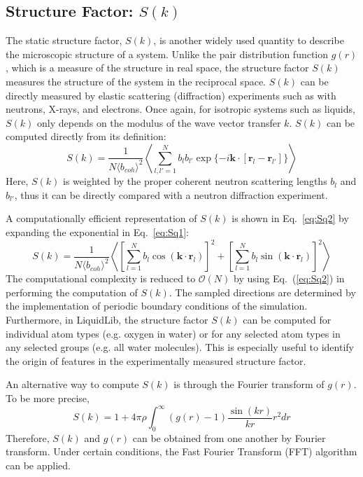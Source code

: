 \documentclass{article}
\begin{document}
\subsection{Structure Factor: $S(k)$} \label{sec::sofk}
The static structure factor, $S(k)$, is another widely used quantity to describe the microscopic structure of a system. Unlike the pair distribution function $g(r)$, which is a measure of the structure in real space, the structure factor $S(k)$ measures the structure of the system in the reciprocal space. $S(k)$ can be directly measured by elastic scattering (diffraction) experiments such as with neutrons, X-rays, and electrons. Once again, for isotropic systems such as liquids, $S(k)$ only depends on the modulus of the wave vector transfer $k$. $S(k)$ can be computed directly from its definition: 
\begin{equation}
	\label{eq:Sq1}
	S(k) = \frac{1}{N\langle b_{coh}\rangle^2}\left\langle\sum_{l,l'=1}^{N} b_lb_{l'}\exp{\{-i\mathbf{k}\cdot[\mathbf{r}_l - \mathbf{r}_{l'}]\}}\right\rangle
\end{equation}
Here, $S(k)$ is weighted by the proper coherent neutron scattering lengths $b_l$ and $b_{l'}$, thus it can be directly compared with a neutron diffraction experiment.

A computationally efficient representation of $S(k)$ is shown in Eq.~\ref{eq:Sq2} by expanding the exponential in Eq.~\ref{eq:Sq1}:
\begin{equation}
	\label{eq:Sq2}
	S(k) = \frac{1}{N\langle b_{coh}\rangle^2}\left\langle\left[\sum_{l=1}^{N} b_l\cos(\mathbf{k}\cdot\mathbf{r}_l)\right]^2+\left[\sum_{l=1}^{N} b_l\sin(\mathbf{k}\cdot\mathbf{r}_l)\right]^2\right\rangle
\end{equation} 
The computational complexity is reduced to $\mathcal{O}(N)$ by using Eq.~(\ref{eq:Sq2}) in performing the computation of $S(k)$. The sampled directions are determined by the implementation of periodic boundary conditions of the simulation. Furthermore, in LiquidLib, the structure factor $S(k)$ can be computed for individual atom types (e.g. oxygen in water) or for any selected atom types in any selected groups (e.g. all water molecules). This is especially useful to identify the origin of features in the experimentally measured structure factor.

An alternative way to compute $S(k)$ is through the Fourier transform of $g(r)$. To be more precise,
\begin{equation}
	\label{eq:Sq-gr}
	S(k) = 1 + 4 \pi \rho \int_0^\infty (g(r)-1) \frac{\sin{(kr)}}{kr} r^2 dr
\end{equation}
Therefore, $S(k)$ and $g(r)$ can be obtained from one another by Fourier transform. Under certain conditions, the Fast Fourier Transform (FFT) algorithm can be applied.
\end{document}
